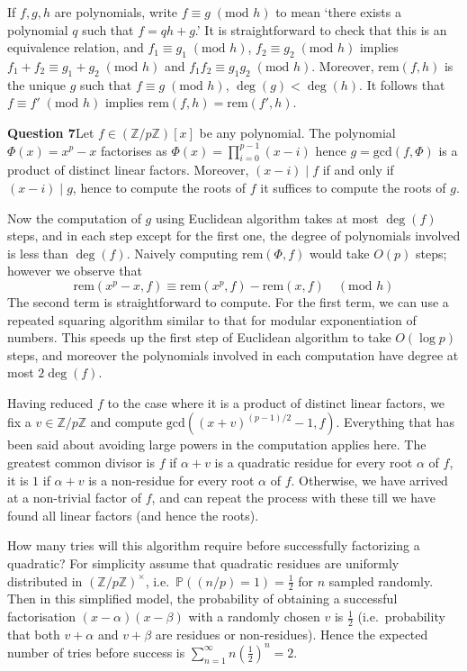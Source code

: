 \documentclass[12pt]{article}
\newcommand{\textmod}[1]{\;(\text{mod }#1)}
\newcommand{\mathmod}[1]{\quad(\text{mod }#1)}
\begin{document}
If \(f,g,h\) are polynomials, write \(f\equiv g\textmod{h}\) to mean `there
exists a polynomial \(q\) such that \(f = qh+g\).' It is straightforward to
check that this is an equivalence relation, and \(f_1\equiv g_1\textmod{h}\),
\(f_2\equiv g_2\textmod{h}\) implies \(f_1+f_2 \equiv g_1+g_2\textmod{h}\) and
\(f_1f_2\equiv g_1g_2\textmod{h}\).  Moreover, \(\text{rem}(f,h)\) is the unique
\(g\) such that \(f\equiv g\textmod{h}\), \(\deg(g)<\deg(h)\). It follows that
\(f\equiv f'\textmod{h}\) implies \(\text{rem}(f,h)=\text{rem}(f',h)\).

\textbf{Question 7}\quad Let \(f \in (\mathbb{Z}/p\mathbb{Z})[x]\) be any polynomial. The polynomial
\(\Phi(x)=x^p-x \) factorises as \(\Phi(x) = \prod_{i=0}^{p-1}(x-i)\) hence
\(g=\text{gcd}(f,\Phi)\) is a product of distinct linear factors. Moreover,
\((x-i)\;|\;f\) if and only if \((x-i)\;|\;g\), hence to compute the roots of
\(f\) it suffices to compute the roots of \(g\).

Now the computation of \(g\) using Euclidean algorithm takes at most \(\deg(f)\)
steps, and in each step except for the first one, the degree of polynomials
involved is less than \(\deg(f)\). Naively computing \(\text{rem}(\Phi, f)\)
would take \(O(p)\) steps; however we observe that
\[\text{rem}(x^p-x,f)\equiv \text{rem}(x^p,f)-\text{rem}(x,f) \mathmod{h}\]
The second term is straightforward to compute. For the first term, we can use a
repeated squaring algorithm similar to that for modular exponentiation of
numbers. This speeds up the first step of Euclidean algorithm to take \(O(\log
p)\) steps, and moreover the polynomials involved in each computation have
degree at most \(2\deg(f)\).

Having reduced \(f\) to the case where it is a product of distinct linear
factors, we fix a \(v \in \mathbb{Z}/p\mathbb{Z}\) and compute
\(\text{gcd}((x+v)^{(p-1)/2}-1, f)\). Everything that has been said about
avoiding large powers in the computation applies here. The greatest common
divisor is \(f\) if \(\alpha+v\) is a quadratic residue for every root
\(\alpha\) of \(f\), it is \(1\) if \(\alpha+v\) is a non-residue for every root
\(\alpha\) of \(f\). Otherwise, we have arrived at a non-trivial factor
of \(f\), and can repeat the process with these till we have found all
linear factors (and hence the roots).

How many tries will this algorithm require before successfully factorizing a
quadratic? For simplicity assume that quadratic residues are uniformly
distributed in
\((\mathbb{Z}/p\mathbb{Z})^\times\), i.e.\ \(\mathbb{P}((n/p)=1)=\frac{1}{2}\)
for \(n\) sampled randomly. Then in this simplified model, the
probability of obtaining a successful factorisation \((x-\alpha)(x-\beta)\)
with a randomly chosen \(v\) is \(\frac{1}{2}\) (i.e.\ probability that both \(v+\alpha\) and \(v+\beta\) are residues or non-residues). Hence the expected number of tries before success is \(\sum_{n=1}^\infty n (\frac{1}{2})^n=2\).
\end{document}
